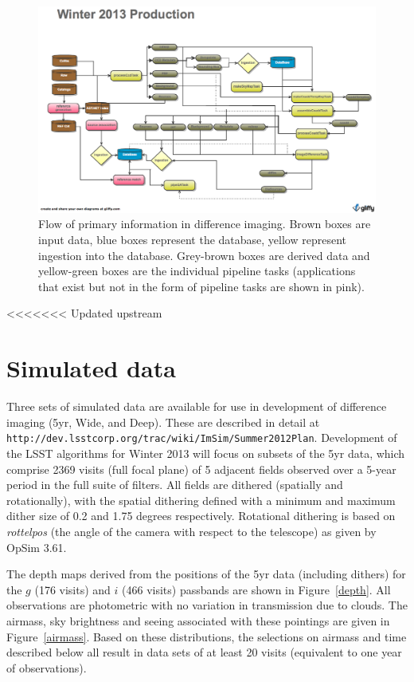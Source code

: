 \documentclass[12pt]{article}
\begin{document}
\begin{figure}
\includegraphics[width=\textwidth]{Figures/Winter_2013.png}
\caption{Flow of primary information in difference imaging. Brown
  boxes are input data, blue boxes represent the database, yellow
  represent ingestion into the database. Grey-brown boxes are derived
  data and yellow-green boxes are the individual pipeline tasks (applications
  that exist but not in the form of pipeline tasks are shown in pink).}
\label{flow}
\end{figure}

\clearpage 
<<<<<<< Updated upstream

\section{Simulated data} 

Three sets of simulated data are available for use in development of
difference imaging (5yr, Wide, and Deep). These are described in
detail at {\tt
  http://dev.lsstcorp.org/trac/wiki/ImSim/Summer2012Plan}.
Development of the LSST algorithms for Winter 2013 will focus on
subsets of the 5yr data, which comprise 2369 visits (full focal plane)
of 5 adjacent fields observed over a 5-year period in the full suite
of filters. All fields are dithered (spatially and rotationally), with the
spatial dithering defined with a minimum and maximum dither size of
0.2 and 1.75 degrees respectively. Rotational dithering is based on
{\it rottelpos} (the angle of the camera with respect to the
telescope) as given by OpSim 3.61.

The depth maps derived from the positions of the 5yr data (including
dithers) for the $g$ (176 visits) and $i$ (466 visits) passbands are
shown in Figure~\ref{depth}. All observations are photometric with no
variation in transmission due to clouds. The airmass, sky brightness
and seeing associated with these pointings are given in
Figure~\ref{airmass}. Based on these distributions, the selections on
airmass and time described below all result in data sets of at least
20 visits (equivalent to one year of observations).
\end{document}
